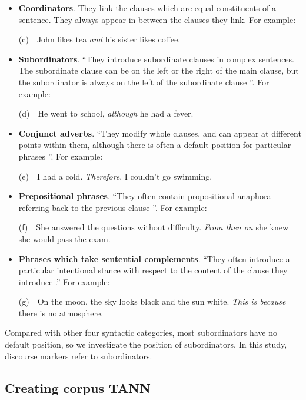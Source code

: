 \documentclass[english]{jnlp_1.3e}
\begin{document}
\begin{itemize}

  \item \textbf{Coordinators}. They link the clauses which are equal constituents
of a sentence. They always appear in between the clauses they link. For example:

(c)~~John likes tea \textit{and} his sister likes coffee.

  \item \textbf{Subordinators}. ``They introduce subordinate clauses in complex
sentences. The subordinate clause can be on the left or the right of the main clause,
but the subordinator is always on the left of the subordinate clause \cite{Knott96}''.
For example:

(d)~~He went to school, \textit{although} he had a fever.

  \item \textbf{Conjunct adverbs}. ``They modify whole clauses, and can
appear at different points within them, although there is often a default
position for particular phrases \cite{Knott96}''. For example:

(e)~~I had a cold. \textit{Therefore}, I couldn't go swimming.

  \item \textbf{Prepositional phrases}. ``They often contain propositional
anaphora referring back to the previous clause \cite{Knott96}''. For example:

(f)~~She answered the questions without difficulty. \textit{From then on} she
   knew she would pass the exam.

  \item \textbf{Phrases which take sentential complements}. ``They often
introduce a particular intentional stance with respect to the content of
the clause they introduce \cite{Knott96}.'' For example:

(g)~~On the moon, the sky looks black and the sun white. \textit{This is because}
there is no atmosphere. 

\end{itemize}

Compared with other four syntactic categories, most subordinators have no default
position, so we investigate the position of subordinators. In this study, 
discourse markers refer to subordinators.  

\subsection{Creating corpus TANN}
\end{document}
